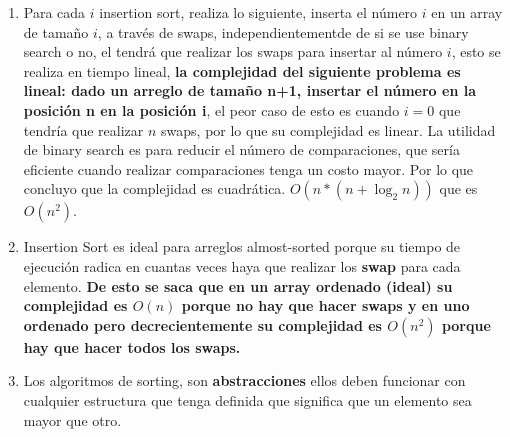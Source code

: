 \documentclass[14pt]{extarticle}
\begin{document}
\begin{enumerate}
    \item Para cada $i$ insertion sort, realiza lo siguiente, inserta el número $i$ en un array de tamaño $i$, a través de swaps, independientementde de si se use binary search o no, el tendrá que realizar los swaps para insertar al número $i$, esto se realiza en tiempo lineal, \textbf{la complejidad del siguiente problema es lineal: dado un arreglo de tamaño n+1, insertar el número en la posición n en la posición i}, el peor caso de esto es cuando $i = 0$ que tendría que realizar $n$ swaps, por lo que su complejidad es linear. La utilidad de binary search es para reducir el número de comparaciones, que sería eficiente cuando realizar comparaciones tenga un costo mayor. Por lo que concluyo que la complejidad es cuadrática. $O(n*(n + \log_2{n}))$ que es $O(n^2)$. 
    \item Insertion Sort es ideal para arreglos almost-sorted porque su tiempo de ejecución radica en cuantas veces haya que realizar los \textbf{swap} para cada elemento. \textbf{De esto se saca que en un array ordenado (ideal) su complejidad es $O(n)$ porque no hay que hacer swaps y en uno ordenado pero decrecientemente su complejidad es $O(n^2)$ porque hay que hacer todos los swaps. }
    \item Los algoritmos de sorting, son \textbf{abstracciones} ellos deben funcionar con cualquier estructura que tenga definida que significa que un elemento sea mayor que otro. 
\end{enumerate}
\end{document}
